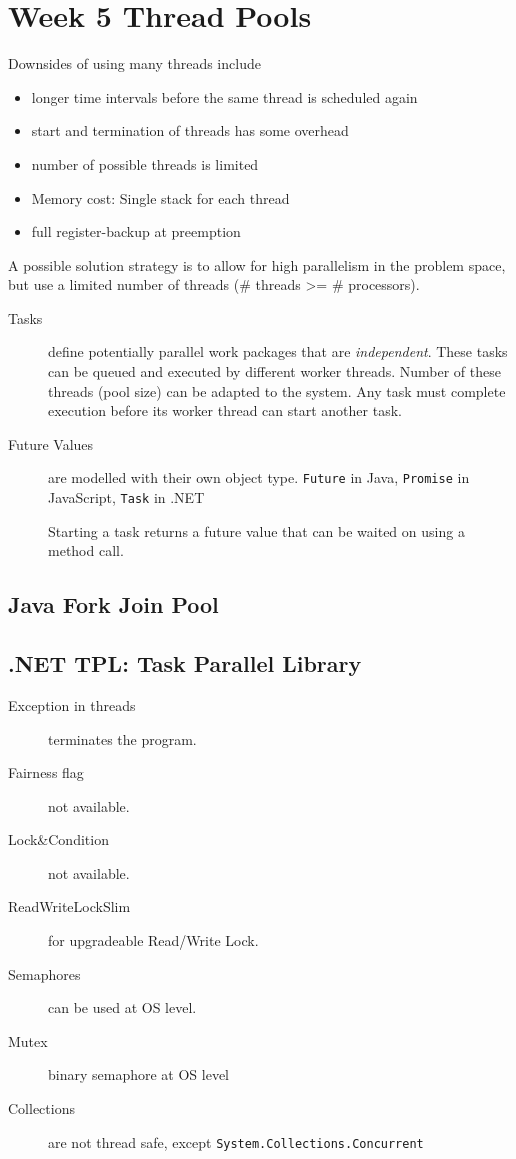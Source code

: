 \section{Week 5 Thread Pools}

Downsides of using many threads include
\begin{itemize}
    \item longer time intervals before the same thread is scheduled again
    \item start and termination of threads has some overhead
    \item number of possible threads is limited
    \item Memory cost: Single stack for each thread
    \item full register-backup at preemption
\end{itemize}

A possible solution strategy is to allow for high parallelism in the problem space, but use a limited number of threads (\# threads >= \# processors).

\begin{description}
  \item[Tasks] define potentially parallel work packages that are \textit{independent}. These tasks can be queued and executed by different worker threads. Number of these threads (pool size) can be adapted to the system. Any task must complete execution before its worker thread can start another task.
  \item[Future Values] are modelled with their own object type. \texttt{Future} in Java, \texttt{Promise} in JavaScript, \texttt{Task} in .NET
  
  Starting a task returns a future value that can be waited on using a method call.
\end{description}

\subsection{Java Fork Join Pool}

\subsection{.NET TPL: Task Parallel Library}

\begin{description}
  \item[Exception in threads] terminates the program.
  \item[Fairness flag] not available.
  \item[Lock\&Condition] not available.
  \item[ReadWriteLockSlim] for upgradeable Read/Write Lock.
  \item[Semaphores] can be used at OS level.
  \item[Mutex] binary semaphore at OS level
  \item[Collections] are not thread safe, except \texttt{System.Collections.Concurrent} 
\end{description}